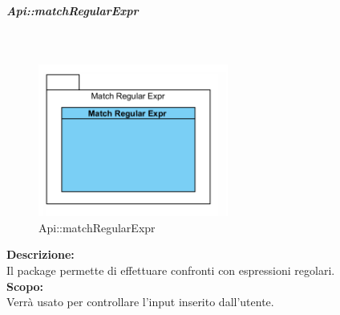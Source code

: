 \begin{samepage}
\subparagraph{Api\-::match\-Regular\-Expr}\label{api-regexpr}\mbox{}\\
\nopagebreak
\begin{figure}[H]
	\centering
	\includegraphics[height=5cm]{diagrammi_img/classi_e_package/api_matchex.png}
	\caption{Api\-::match\-Regular\-Expr}
\end{figure}
\end{samepage}
\textbf{Descrizione:}\\ 
Il package permette di effettuare confronti con espressioni regolari.\\ 
\textbf{Scopo:}\\
Verrà usato per controllare l'input inserito dall'utente.

